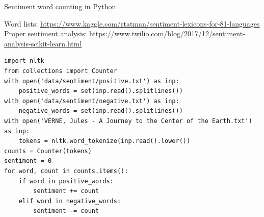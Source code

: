 \documentclass[aspectratio=169,usenames,dvipsnames]{beamer}
\begin{document}
\begin{frame}[fragile]{Sentiment word counting in Python}
    \begin{reference}\scriptsize
        Word lists: \url{https://www.kaggle.com/rtatman/sentiment-lexicons-for-81-languages} \\
        Proper sentiment analysis: \url{https://www.twilio.com/blog/2017/12/sentiment-analysis-scikit-learn.html}
    \end{reference}
\begin{lstlisting}
import nltk
from collections import Counter
with open('data/sentiment/positive.txt') as inp:
    positive_words = set(inp.read().splitlines())
with open('data/sentiment/negative.txt') as inp:
    negative_words = set(inp.read().splitlines())
with open('VERNE, Jules - A Journey to the Center of the Earth.txt') as inp:
    tokens = nltk.word_tokenize(inp.read().lower())
counts = Counter(tokens)
sentiment = 0
for word, count in counts.items():
    if word in positive_words:
        sentiment += count
    elif word in negative_words:
        sentiment -= count
\end{lstlisting}
\end{frame}
\end{document}
